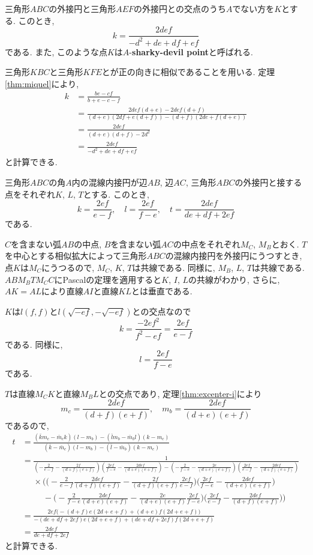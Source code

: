 %
\begin{bthm}
三角形$ABC$の外接円と三角形$AEF$の外接円との交点のうち$A$でない方を$K$とする.
このとき,
\[k=\frac{2def}{-d^2+de+df+ef}\]
である.
また, このような点$K$は$A$-\textbf{sharky-devil point}と呼ばれる.
\end{bthm}
\begin{prf*}
三角形$KBC$と三角形$KFE$とが正の向きに相似であることを用いる.
定理\ref{thm:miquel}により,
\begin{align*}
k
&=\frac{be-cf}{b+e-c-f}\\
&=\frac{2def(d+e)-2def(d+f)}{(d+e)(2df+e(d+f))-(d+f)(2de+f(d+e))}\\
&=\frac{2def}{(d+e)(d+f)-2d^2}\\
&=\frac{2def}{-d^2+de+df+ef}
\end{align*}
と計算できる.
\end{prf*}
%
\begin{bthm}
三角形$ABC$の角$A$内の混線内接円が辺$AB$, 辺$AC$, 三角形$ABC$の外接円と接する点をそれぞれ$K$, $L$, $T$とする.
このとき,
\[k=\frac{2ef}{e-f},\quad l=\frac{2ef}{f-e},\quad t=\frac{2def}{de+df+2ef}\]
である.
\end{bthm}
\begin{prf*}
$C$を含まない弧$AB$の中点, $B$を含まない弧$AC$の中点をそれぞれ$M_C$, $M_B$とおく.
$T$を中心とする相似拡大によって三角形$ABC$の混線内接円を外接円にうつすとき, 点$K$は$M_C$にうつるので, $M_C$, $K$, $T$は共線である.
同様に, $M_B$, $L$, $T$は共線である.
$ABM_BTM_CC$にPascalの定理を適用すると$K$, $I$, $L$の共線がわかり, さらに, $AK=AL$により直線$AI$と直線$KL$とは垂直である.

$K$は$l(f,f)$と$l(\sqrt{-ef},-\sqrt{-ef})$との交点なので
\[k=\frac{-2ef^2}{f^2-ef}=\frac{2ef}{e-f}\]
である.
同様に,
\[l=\frac{2ef}{f-e}\]
である.

$T$は直線$M_CK$と直線$M_BL$との交点であり, 定理\ref{thm:excenter-i}により
\[m_c=\frac{2def}{(d+f)(e+f)},\quad m_b=\frac{2def}{(d+e)(e+f)}\]
であるので,
\begin{align*}
t
&=\frac{(\bar km_c-\bar m_ck)(l-m_b)-(\bar lm_b-\bar m_bl)(k-m_c)}{(\bar k-\bar m_c)(l-m_b)-(\bar l-\bar m_b)(k-m_c)}\\
&=\frac{1}{(-\frac{2}{e-f}-\frac{2f}{(d+f)(e+f)})(\frac{2ef}{f-e}-\frac{2def}{(d+e)(e+f)})-(-\frac{2}{f-e}-\frac{2e}{(d+e)(e+f)})(\frac{2ef}{e-f}-\frac{2def}{(d+f)(e+f)})}\\
&\phantom{{}={}}\times\Biggl(\biggl(-\frac{2}{e-f}\frac{2def}{(d+f)(e+f)}-\frac{2f}{(d+f)(e+f)}\frac{2ef}{e-f}\biggr)\biggl(\frac{2ef}{f-e}-\frac{2def}{(d+e)(e+f)}\biggr)\\
&\phantom{=\times\Biggl(}-\biggl(-\frac{2}{f-e}\frac{2def}{(d+e)(e+f)}-\frac{2e}{(d+e)(e+f)}\frac{2ef}{f-e}\biggr)\biggl(\frac{2ef}{e-f}-\frac{2def}{(d+f)(e+f)}\biggr)\Biggr)\\
&=\frac{2ef\bigl(-(d+f)e(2d+e+f)+(d+e)f(2d+e+f)\bigr)}{-(de+df+2ef)e(2d+e+f)+(de+df+2ef)f(2d+e+f)}\\
&=\frac{2def}{de+df+2ef}
\end{align*}
と計算できる.
\end{prf*}
